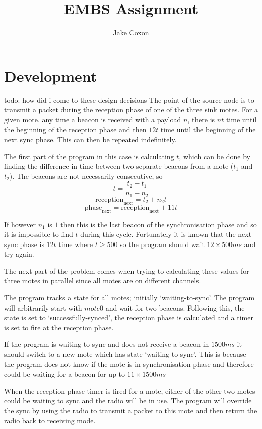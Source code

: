 \documentclass{report}
\newcommand\receptiont[1]{\text{reception}_\text{#1}}
\newcommand\phaset[1]{\text{phase}_\text{#1}}
\begin{document}
\title{EMBS Assignment}
\author{Jake Coxon}
\maketitle

\section{Development}

todo: how did i come to these design decisions
The point of the source node is to transmit a packet during the reception phase of one of the three sink motes. For a given mote, any time a beacon is received with a payload $n$, there is $n t$ time until the beginning of the reception phase and then $12 t$ time until the beginning of the next sync phase. This can then be repeated indefinitely.

The first part of the program in this case is calculating $t$, which can be done by finding the difference in time between two separate beacons from a mote ($t_1$ and $t_2$). The beacons are not necessarily consecutive, so 
\[t = \frac{t_2 - t_1}{n_1 - n_2}\]
\[\receptiont{next} = t_2 + n_2 t\]
\[\phaset{next} = \receptiont{next} + 11 t\]

If however $n_1$ is $1$ then this is the last beacon of the synchronisation phase and so it is impossible to find $t$ during this cycle. Fortunately it is known that the next sync phase is $12 t$ time where $t \ge 500$ so the program should wait $12 \times 500ms$ and try again.

The next part of the problem comes when trying to calculating these values for three motes in parallel since all motes are on different channels. 

The program tracks a state for all motes; initially `waiting-to-sync'. The program will arbitrarily start with $mote0$ and wait for two beacons. Following this, the state is set to `successfully-synced', the reception phase is calculated and a timer is set to fire at the reception phase.

If the program is waiting to sync and does not receive a beacon in $1500ms$ it should switch to a new mote which has state `waiting-to-sync'. This is because the program does not know if the mote is in synchronisation phase and therefore could be waiting for a beacon for up to $11 \times 1500ms$

When the reception-phase timer is fired for a mote, either of the other two motes could be waiting to sync and the radio will be in use. The program will override the sync by using the radio to transmit a packet to this mote and then return the radio back to receiving mode. 
\end{document}
